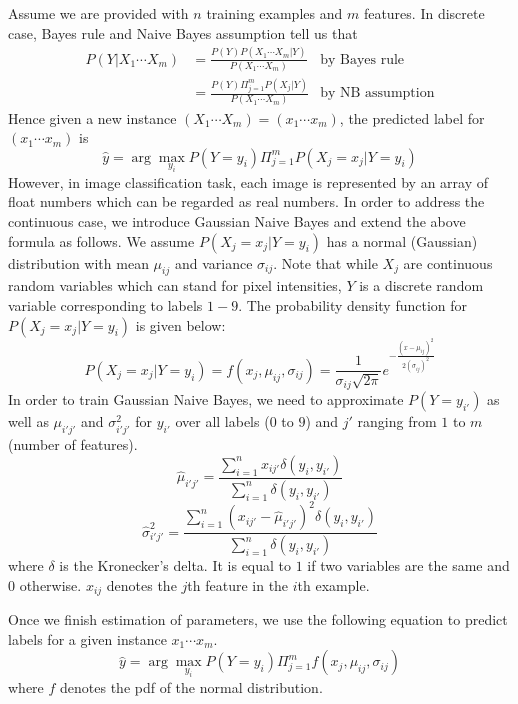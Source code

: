 \documentclass{acm_proc_article-sp}
\begin{document}
Assume we are provided with $n$ training examples and $m$ features. In discrete case, Bayes rule and Naive Bayes assumption tell us that
\begin{align*}
P(Y | X_1 \cdots X_m ) &= \frac{P(Y) P ( X_1 \cdots X_m| Y )}{P(X_1 \cdots X_m)} &\textrm{by Bayes rule}\\
&= \frac{P(Y) \Pi_{j=1}^m  P ( X_j | Y )}{P(X_1 \cdots X_m)} &\textrm{by NB assumption}
\end{align*}
Hence given a new instance $(X_1\cdots X_m) = (x_1\cdots x_m)$, the predicted label for $(x_1\cdots x_m)$ is
\begin{equation}
\hat{y} = \arg \max_{y_i} P(Y = y_i) \Pi_{j=1}^m P(X_j=x_j | Y = y_i) \label{eq:max}
\end{equation}
However, in image classification task, each image is represented by an array of float numbers which can be regarded as real numbers. In order to address the continuous case, we introduce Gaussian Naive Bayes and extend the above formula as follows. We assume $P(X_j=x_j | Y = y_i)$ has a normal (Gaussian) distribution with mean $\mu_{ij}$ and variance $\sigma_{ij}$. Note that while $X_j$ are continuous random variables which can stand for pixel intensities,  $Y$ is a discrete random variable corresponding to labels $1 - 9$.  The probability density function for $P(X_j=x_j | Y = y_i)$ is given below:
\begin{equation}
P(X_j=x_j | Y = y_i) =  f (x_j, \mu_{ij}, \sigma_{ij} ) =\frac{1}{\sigma_{ij}\sqrt{2\pi}}e^{-\frac{(x-\mu_{ij})^2}{2(\sigma_{ij})^2}} \label{eq:pdf}
\end{equation}
In order to train Gaussian Naive Bayes, we need to approximate $P(Y=y_{i'})$ as well as $\mu_{i'j'}$ and  $\sigma_{i'j'}^2$ for $y_{i'}$ over all labels ($0$ to $9$) and $j'$ ranging from $1$ to $m$ (number of features). 
\begin{equation}
\hat{\mu}_{i'j'} = \frac{\sum_{i=1}^n x_{ij'} \delta(y_{i}, y_{i'})}{\sum_{i=1}^n \delta(y_{i}, y_{i'})} \label{eq:mean}
\end{equation}
\begin{equation}
\hat{\sigma}_{i'j'}^2 =  \frac{\sum_{i=1}^n ( x_{ij'}-\hat{\mu}_{i'j'})^2 \delta(y_{i}, y_{i'})}{\sum_{i=1}^n \delta(y_{i}, y_{i'})} \label{eq:var}
\end{equation}
where $\delta$ is the Kronecker's delta. It is equal to $1$ if two variables are the same and $0$ otherwise. $x_{ij}$ denotes the $j$th feature in the $i$th  example.


Once we finish estimation of parameters, we use the following equation to predict labels for a given instance $x_1 \cdots x_m$. 
\begin{equation}
\hat{y} = \arg \max_{y_i} P(Y = y_i) \Pi_{j=1}^m f (x_j, \mu_{ij}, \sigma_{ij} ) \label{eq: argmax}
\end{equation}
where $f$ denotes the pdf of the normal distribution.
\end{document}
